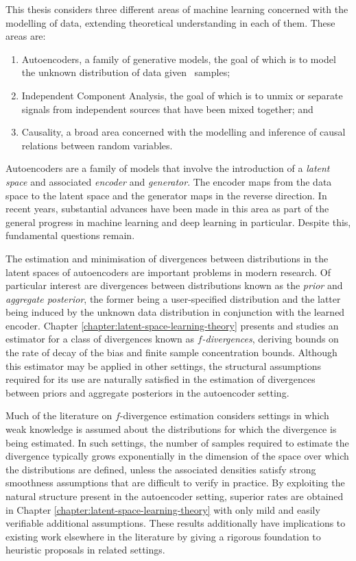 This thesis considers three different areas of machine learning concerned with the modelling of data, extending theoretical understanding in each of them.
These areas are:
\begin{enumerate}
\item Autoencoders, a family of generative models, the goal of which is to model the unknown distribution of data given \iid~samples;
\item Independent Component Analysis, the goal of which is to unmix or separate signals from independent sources that have been mixed together; and
\item Causality, a broad area concerned with the modelling and inference of causal relations between random variables.
\end{enumerate}
Autoencoders are a family of models that involve the introduction of a \emph{latent space} and associated \emph{encoder} and \emph{generator}. 
The encoder maps from the data space to the latent space and the generator maps in the reverse direction. 
In recent years, substantial advances have been made in this area as part of the general progress in machine learning and deep learning in particular.
Despite this, fundamental questions remain.

The estimation and minimisation of divergences between distributions in the latent spaces of autoencoders are important problems in modern research.
Of particular interest are divergences between distributions known as the \emph{prior} and \emph{aggregate posterior}, the former being a user-specified distribution and the latter being induced by the unknown data distribution in conjunction with the learned encoder.
Chapter \ref{chapter:latent-space-learning-theory} presents and studies an estimator for a class of divergences known as \emph{$f$-divergences}, deriving bounds on the rate of decay of the bias and finite sample concentration bounds.
Although this estimator may be applied in other settings, the structural assumptions required for its use are naturally satisfied in the estimation of divergences between priors and aggregate posteriors in the autoencoder setting. 


Much of the literature on $f$-divergence estimation considers settings in which weak knowledge is assumed about the distributions for which the divergence is being estimated. 
In such settings, the number of samples required to estimate the divergence typically grows exponentially in the dimension of the space over which the distributions are defined, unless the associated densities satisfy strong smoothness assumptions that are difficult to verify in practice.
By exploiting the natural structure present in the autoencoder setting, superior rates are obtained in Chapter \ref{chapter:latent-space-learning-theory} with only mild and easily verifiable additional assumptions.
These results additionally have implications to existing work elsewhere in the literature by giving a rigorous foundation to heuristic proposals in related settings.


